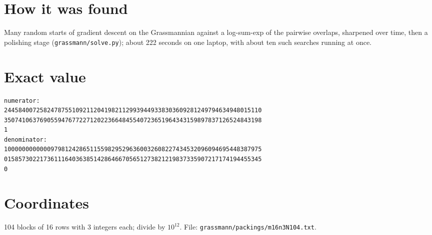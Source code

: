 \documentclass[11pt,a4paper]{article}
\begin{document}
\section{How it was found}
Many random starts of gradient descent on the Grassmannian against a log-sum-exp of the pairwise overlaps, sharpened over time, then a polishing stage (\texttt{grassmann/solve.py}); about 222 seconds on one laptop, with about ten such searches running at once.


\appendix
\section{Exact value}
{\small
\begin{verbatim}
numerator:
244584007258247875510921120419821129939449338303609281249794634948015110
350741063769055947677227120223664845540723651964343159897837126524843198
1
denominator:
100000000000097981242865115598295296360032608227434532096094695448387975
015857302217361116403638514286466705651273821219837335907217174194455345
0
\end{verbatim}}

\section{Coordinates}
104 blocks of 16 rows with 3 integers each; divide by $10^{12}$. File: \texttt{grassmann/packings/m16n3N104.txt}.
{\tiny
\begin{multicols}{3}
\end{multicols}}
\end{document}

